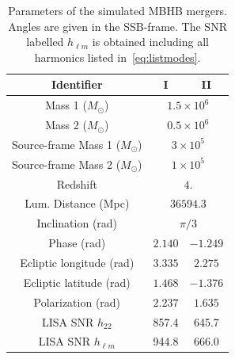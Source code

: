 \documentclass[aps,showpacs,twocolumn,prd,superscriptaddress,nofootinbib]{revtex4-1}
\newcommand{\Msol}{M_{\odot}}
\begin{document}
\begin{table}
	\begin{tabular}{|c||c|c|}
		\hline
		Identifier 		& I 	& II   \\
		\hline
		\hline
		Mass 1 ($\Msol$) 	& \multicolumn{2}{|c|}{$1.5\times10^{6}$} \\
		\hline
		Mass 2 ($\Msol$) 	&  \multicolumn{2}{|c|}{$0.5\times10^{6}$}\\
		\hline
		Source-frame Mass 1 ($\Msol$) 	& \multicolumn{2}{|c|}{$3\times10^{5}$} \\
		\hline
		Source-frame Mass 2 ($\Msol$) 	&  \multicolumn{2}{|c|}{$1\times10^{5}$}\\
		\hline
		Redshift 		&  \multicolumn{2}{|c|}{$4.$}  \\
		\hline
		Lum. Distance (Mpc) 		&  \multicolumn{2}{|c|}{$36594.3$} \\
		\hline
		Inclination (rad) 		& \multicolumn{2}{|c|}{$\pi/3$}  \\
		\hline
		Phase (rad) 			& $2.140$	& $-1.249$ \\
		\hline
		Ecliptic longitude (rad) 			& $3.335$	& $2.275$ \\
		\hline
		Ecliptic latitude (rad) 			& $1.468$	& $-1.376$ \\
		\hline
		Polarization (rad) 			& $2.237$	& $1.635$ \\
		\hline
		\hline
		LISA SNR $h_{22}$			& 857.4 & 645.7 \\
		\hline
		LISA SNR $h_{\ell m}$			& 944.8 & 666.0 \\
		\hline
	\end{tabular}
	\caption{Parameters of the simulated MBHB mergers. Angles are given in the SSB-frame. The $\mathrm{SNR}$ labelled $h_{\ell m}$ is obtained including all harmonics listed in~\eqref{eq:listmodes}.}
	\label{tab:MBHBparams}
\end{table}
\end{document}
